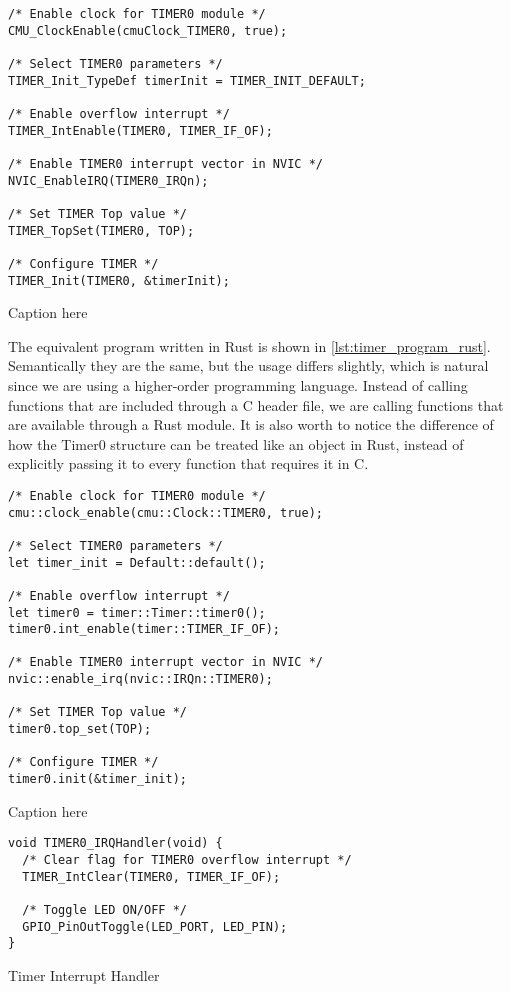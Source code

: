 \begin{listing}[tb]
\begin{verbatim}
/* Enable clock for TIMER0 module */
CMU_ClockEnable(cmuClock_TIMER0, true);

/* Select TIMER0 parameters */
TIMER_Init_TypeDef timerInit = TIMER_INIT_DEFAULT;

/* Enable overflow interrupt */
TIMER_IntEnable(TIMER0, TIMER_IF_OF);

/* Enable TIMER0 interrupt vector in NVIC */
NVIC_EnableIRQ(TIMER0_IRQn);

/* Set TIMER Top value */
TIMER_TopSet(TIMER0, TOP);

/* Configure TIMER */
TIMER_Init(TIMER0, &timerInit);
\end{verbatim}
\caption{Caption here}
\label{lst:timer_program_c}
\end{listing}

The equivalent program written in Rust is shown in \autoref{lst:timer_program_rust}. Semantically
they are the same, but the usage differs slightly, which is natural since we are using a
higher-order programming language. Instead of calling functions that are included through a C header
file, we are calling functions that are available through a Rust module. It is also worth to notice
the difference of how the Timer0 structure can be treated like an object in Rust, instead of
explicitly passing it to every function that requires it in C.

\begin{listing}[tb]
\begin{verbatim}
/* Enable clock for TIMER0 module */
cmu::clock_enable(cmu::Clock::TIMER0, true);

/* Select TIMER0 parameters */
let timer_init = Default::default();

/* Enable overflow interrupt */
let timer0 = timer::Timer::timer0();
timer0.int_enable(timer::TIMER_IF_OF);

/* Enable TIMER0 interrupt vector in NVIC */
nvic::enable_irq(nvic::IRQn::TIMER0);

/* Set TIMER Top value */
timer0.top_set(TOP);

/* Configure TIMER */
timer0.init(&timer_init);
\end{verbatim}
\caption{Caption here}
\label{lst:timer_program_rust}
\end{listing}

\begin{listing}[tb]
\begin{verbatim}
void TIMER0_IRQHandler(void) {
  /* Clear flag for TIMER0 overflow interrupt */
  TIMER_IntClear(TIMER0, TIMER_IF_OF);

  /* Toggle LED ON/OFF */
  GPIO_PinOutToggle(LED_PORT, LED_PIN);
}
\end{verbatim}
\caption{Timer Interrupt Handler}
\label{lst:timer_interrupt_handler}
\end{listing}

